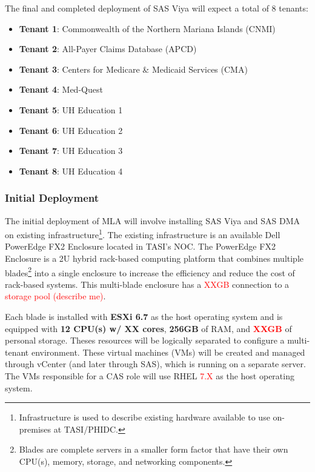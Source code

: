 The final and completed deployment of SAS Viya will expect a total of 8 tenants:

\begin{itemize}
    \item \textbf{Tenant 1}: Commonwealth of the Northern Mariana Islands (CNMI)
    \item \textbf{Tenant 2}: All-Payer Claims Database (APCD)
    \item \textbf{Tenant 3}: Centers for Medicare \& Medicaid Services (CMA)
    \item \textbf{Tenant 4}: Med-Quest
    \item \textbf{Tenant 5}: UH Education 1
    \item \textbf{Tenant 6}: UH Education 2
    \item \textbf{Tenant 7}: UH Education 3
    \item \textbf{Tenant 8}: UH Education 4
\end{itemize}

\subsubsection{Initial Deployment}

The initial deployment of MLA will involve installing SAS Viya and SAS DMA on existing infrastructure\footnote{Infrastructure is used to describe existing hardware available to use on-premises at TASI/PHIDC.}. The existing infrastructure is  an available Dell PowerEdge FX2 Enclosure located in TASI's NOC. The PowerEdge FX2 Enclosure is a 2U hybrid rack-based computing platform that combines multiple blades\footnote{Blades are complete servers in a smaller form factor that have their own CPU(s), memory, storage, and networking components.} into a single enclosure to increase the efficiency and reduce the cost of rack-based systems. This multi-blade enclosure has a \textcolor{red}{XXGB} connection to a \textcolor{red}{storage pool (describe me)}.

Each blade is installed with \textbf{ESXi 6.7} as the host operating system and is equipped with \textbf{12 CPU(s) w/ XX cores}, \textbf{256GB} of RAM, and \textcolor{red}{\textbf{XXGB}} of personal storage. Theses resources will be logically separated to configure a multi-tenant environment. These virtual machines (VMs) will be created and managed through vCenter (and later through SAS), which is running on a separate server. The VMs responsible for a CAS role will use RHEL \textcolor{red}{7.X} as the host operating system. 

